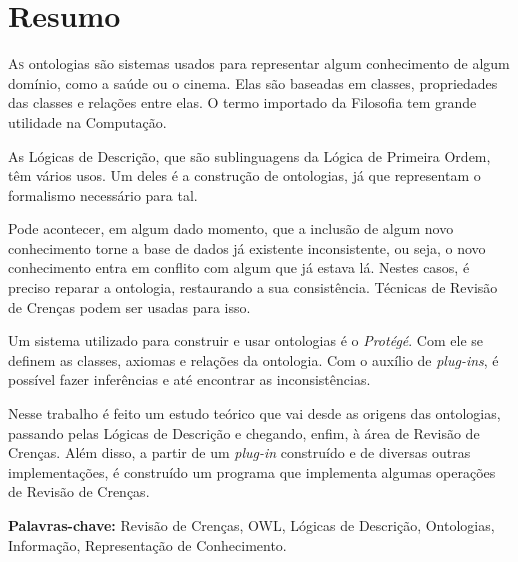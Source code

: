 \chapter*{Resumo}

\lettrine{A}{s} ontologias são sistemas usados para representar algum conhecimento de algum domínio, como a saúde ou o cinema. Elas são baseadas em classes, propriedades das classes e relações entre elas. O termo importado da Filosofia tem grande utilidade na Computação.

As Lógicas de Descrição, que são sublinguagens da Lógica de Primeira Ordem, têm vários usos. Um deles é a construção de ontologias, já que representam o formalismo necessário para tal. 

Pode acontecer, em algum dado momento, que a inclusão de algum novo conhecimento torne a base de dados já existente inconsistente, ou seja, o novo conhecimento entra em conflito com algum que já estava lá. Nestes casos, é preciso reparar a ontologia, restaurando a sua consistência. Técnicas de Revisão de Crenças podem ser usadas para isso.

Um sistema utilizado para construir e usar ontologias é o \textit{Protégé}. Com ele se definem as classes, axiomas e relações da ontologia. Com o auxílio de \textit{plug-ins}, é possível fazer inferências e até encontrar as inconsistências. 

Nesse trabalho é feito um estudo teórico que vai desde as origens das ontologias, passando pelas Lógicas de Descrição e chegando, enfim, à área de Revisão de Crenças. Além disso, a partir de um \textit{plug-in} construído e de diversas outras implementações, é construído um programa que implementa algumas operações de Revisão de Crenças.

\noindent \textbf{Palavras-chave:} Revisão de Crenças, OWL, Lógicas de Descrição, Ontologias, Informação, Representação de Conhecimento.